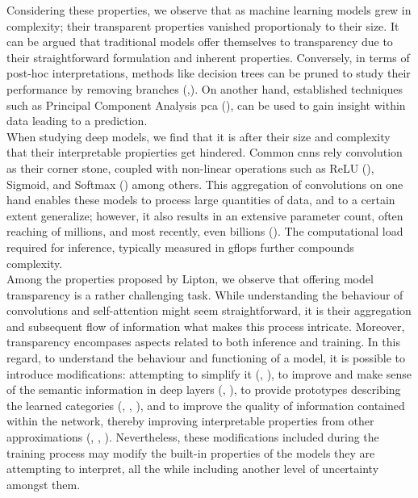 \noindent Considering these properties, we observe that as machine learning models grew in 
complexity; their transparent properties vanished proportionaly to their size. It can be argued 
that traditional models offer themselves to  transparency due to their straightforward formulation 
and inherent properties. Conversely, in terms of post-hoc interpretations, methods like decision 
trees \cite{ho1995random} can be pruned to study their performance by removing 
branches (\cite{lakkaraju2016interpretable},\cite{mothilal2020explaining}). 
On another hand, established techniques such as Principal Component Analysis \gls{pca} 
(\cite{wold1987principal}), can be used to gain insight within data leading to a prediction.\\

\noindent When studying deep models, we find that it is after their size and complexity that their 
interpretable propierties get hindered. Common  \glspl{cnn} 
rely convolution as their corner stone, coupled with non-linear operations such as 
ReLU (\cite{fukushima1975cognitron}), Sigmoid, and Softmax (\cite{hopfield1985neural}) among others.
This aggregation of convolutions on one hand enables these models to process large quantities of 
data, and to a certain extent generalize; however, it also results in an extensive parameter count,
often reaching of millions, and most recently, even billions (\cite{openai_compute}). The 
computational load required for inference, typically measured in \gls{gflops} further compounds 
complexity.\\

\noindent Among the properties proposed by Lipton, we observe that offering model transparency is a 
rather challenging task. While understanding the behaviour of convolutions and 
self-attention might seem straightforward, it is their aggregation and subsequent flow of 
information what makes this process intricate. Moreover, transparency encompases aspects related to 
both inference and training. In this regard, to understand the behaviour and functioning of a model, 
it is possible to introduce modifications: attempting  to simplify it (\cite{wu2018beyond}, 
\cite{wu2020regional}), to improve and make sense of the semantic information in deep layers 
(\cite{bau2017network}, \cite{zhou2018interpreting}), to provide prototypes describing the learned
categories (\cite{li2018deep}, \cite{chen2019looks}, \cite{rymarczyk2022interpretable}), and to 
improve the quality of information contained within the network, thereby improving interpretable 
properties from other approximations (\cite{ismail2021improving}, \cite{Zhou_2022_BMVC}, 
\cite{ross2017right}). Nevertheless, these modifications included during the training process may 
modify the built-in properties of the models they are attempting to interpret, all the while 
including another level of uncertainty amongst them.\\

